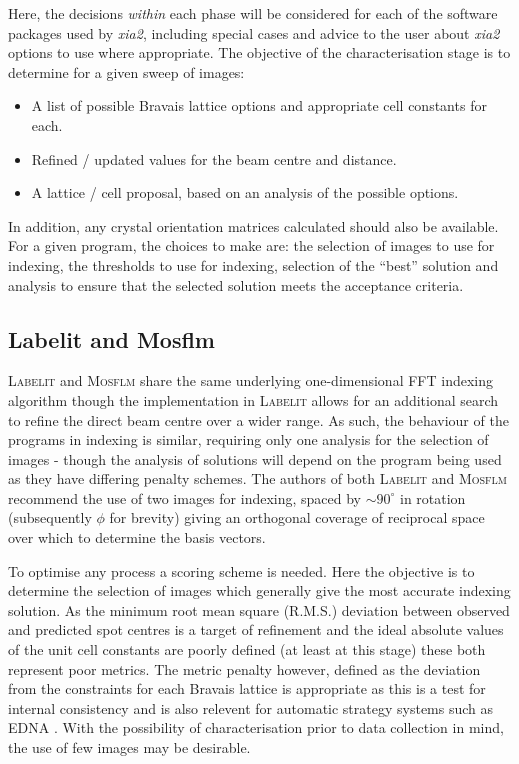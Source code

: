\documentclass[preprint,pdf]{iucr}
\begin{document}
Here, the decisions \emph{within} each phase will be considered for
each of the software packages used by \emph{xia2},
including special cases and
advice to the user about \emph{xia2} options to use where
appropriate. The objective of the characterisation stage is to
determine for a given sweep of images:

\begin{itemize}
\item{A list of possible Bravais lattice options and appropriate cell
    constants for each.}
\item{Refined / updated values for the beam centre and distance.}
\item{A lattice / cell proposal, based on an analysis of the possible
    options.}
\end{itemize}

\noindent
In addition, any crystal orientation
matrices calculated
should also be available. For a given program, the choices to make
are: the selection of images to use for indexing, the thresholds to
use for indexing, selection of the ``best'' solution and analysis to
ensure that the selected solution meets the acceptance criteria. 

\subsection{Labelit and Mosflm}

\textsc{Labelit} and \textsc{Mosflm} share the same underlying one-dimensional FFT
indexing algorithm \cite{Steller:mf0013} though the
implementation in \textsc{Labelit} allows for an additional search to refine
the direct beam centre over a wider range. As such, the behaviour of
the programs in indexing is similar, requiring only one analysis for
the selection of images - though the analysis of solutions will depend
on the program being used as they have differing penalty schemes.
The authors of both \textsc{Labelit} and \textsc{Mosflm} recommend the use of two images
for indexing, spaced by $\sim 90^{\circ}$ in rotation (subsequently $\phi$ for
brevity) giving an orthogonal coverage of 
reciprocal space over which to determine the basis vectors. 

To optimise any process a scoring scheme is needed. Here the objective
is to determine the selection of images which generally give the most
accurate indexing solution. As the minimum root mean square
(R.M.S.) deviation between observed
and predicted spot centres is a target of refinement and the ideal absolute
values of the unit cell constants are poorly defined (at least at this
stage) these both represent poor metrics. The metric penalty however,
defined as the deviation from the constraints for each Bravais lattice
\cite{Grosse-Kunstleve:sh5006} is appropriate as this is a test for
internal consistency 
and is also relevent for automatic strategy systems such as EDNA
\cite{Incardona:wa5014}. With the possibility of characterisation
prior to data collection in mind, the use of few images may be desirable.
\end{document}
